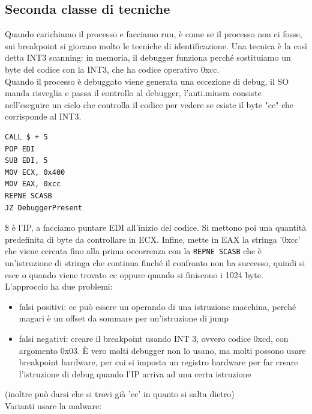 \documentclass[12pt, oneside]{extbook}
\begin{document}
\subsection{Seconda classe di tecniche}
Quando carichiamo il processo e facciamo run, è come se il processo non ci fosse, sui breakpoint si giocano molto le tecniche di identificazione. Una tecnica è la così detta INT3 scanning: in memoria, il debugger funziona perché sostituiamo un byte del codice con la INT3, che ha codice operativo 0xcc.\\Quando il processo è debuggato viene generata una eccezione di debug, il SO manda risveglia e passa il controllo al debugger, l'anti.miusra consiste nell'eseguire un ciclo che controlla il codice per vedere se esiste il byte "cc" che corrisponde al INT3.
\begin{lstlisting}
CALL $ + 5
POP EDI
SUB EDI, 5
MOV ECX, 0x400
MOV EAX, 0xcc
REPNE SCASB
JZ DebuggerPresent
\end{lstlisting}
\$ è l'IP, a facciamo puntare EDI all'inizio del codice. Si mettono poi una quantità predefinita di byte da controllare in ECX. Infine, mette in EAX la stringa '0xcc' che viene cercata fino alla prima occorrenza con la \texttt{REPNE SCASB} che è un'istruzione di stringa che continua finché il confronto non ha successo, quindi si esce o quando viene trovato cc oppure quando si finiscono i 1024 byte.\\L'approccio ha due problemi:
\begin{itemize}
\item falsi positivi: cc può essere un operando di una istruzione macchina, perché magari è un offset da sommare per un'istruzione di jump
\item falsi negativi: creare il breakpoint usando INT 3, ovvero codice 0xcd, con argomento 0x03. È vero molti debugger non lo usano, ma molti possono usare breakpoint hardware, per cui si imposta un registro hardware per far creare l'istruzione di debug quando l'IP arriva ad una certa istruzione
\end{itemize}
(inoltre può darsi che si trovi già 'cc' in quanto si salta dietro)\\Varianti usare la malware:
\end{document}
